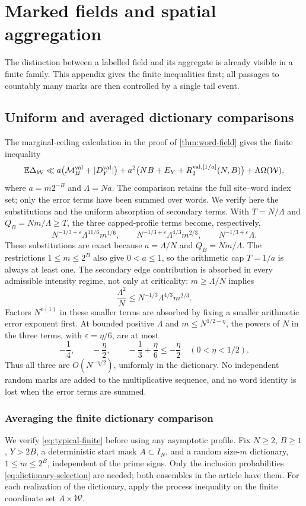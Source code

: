 \section{Marked fields and spatial aggregation}\label{supp:sec:fields}
The distinction between a labelled field and its aggregate is already visible
in a finite family. This appendix gives the finite inequalities first; all
passages to countably many marks are then controlled by a single tail event.

\subsection{Uniform and averaged dictionary comparisons}
The marginal-ceiling calculation in the proof of
\cref{thm:word-field} gives the finite inequality
\[
 \mathbb E\Delta_{\mathcal W}\ll
 a\bigl(\mathcal M_B^{\rm val}+|D_Y^{\rm val}|\bigr)
 +a^2\bigl(NB+E_Y+R_2^{\mathrm{val},[1/a]}(N,B)\bigr)
 +\Lambda\Omega(\mathcal W),
\]
where $a=m2^{-B}$ and $\Lambda=Na$.
The comparison retains the full site--word index set; only the error
terms have been summed over words. We verify here the substitutions
and the uniform absorption of secondary terms.
With $T=N/\Lambda$ and $Q_B=Nm/\Lambda\ge T$, the three capped-profile
terms become, respectively,
\[
 N^{-1/3+\varepsilon}\Lambda^{11/6}m^{1/6},\qquad
 N^{-1/3+\varepsilon}\Lambda^{4/3}m^{2/3},\qquad
 N^{-1/3+\varepsilon}\Lambda.
\]
These substitutions are exact because $a=\Lambda/N$ and
$Q_B=Nm/\Lambda$. The restrictions $1\le m\le2^B$ also give
$0<a\le1$, so the arithmetic cap $T=1/a$ is always at least one.
The secondary edge contribution is absorbed in every admissible
intensity regime, not only at criticality: $m\ge\Lambda/N$ implies
\[
 \frac{\Lambda^2}{N}
 \le N^{-1/3}\Lambda^{4/3}m^{2/3}.
\]
Factors $N^{o(1)}$ in these smaller terms are absorbed by fixing a
smaller arithmetic error exponent first.
At bounded positive $\Lambda$ and $m\le N^{1/2-\eta}$, the powers of
$N$ in the three terms, with $\varepsilon=\eta/6$, are at most
\[
 -\frac14,\qquad -\frac\eta2,\qquad
 -\frac13+\frac\eta6\le-\frac\eta2\quad(0<\eta<1/2).
\]
Thus all three are $O(N^{-\eta/2})$, uniformly in the dictionary. No independent random marks
are added to the multiplicative sequence, and no word identity is lost
when the error terms are summed.

\subsubsection*{Averaging the finite dictionary comparison}
\label{supp:sec:typical-details}
We verify \eqref{eq:typical-finite} before using any asymptotic profile.
Fix $N\ge2$, $B\ge1$, $Y>2B$, a deterministic start mask
$A\subset I_N$, and a random size-$m$ dictionary, $1\le m\le2^B$,
independent of the prime signs. Only the inclusion probabilities
\eqref{eq:dictionary-selection} are needed; both ensembles in the article
have them. For each realization of the dictionary, apply the process
inequality on the finite coordinate set $A\times\mathcal W$.

